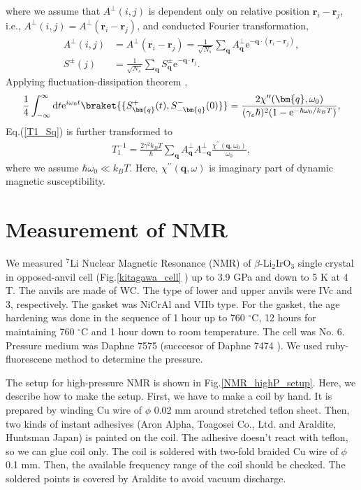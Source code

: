 where we assume that $A^\perp (i, j)$ is dependent only on relative position $\bm{r}_i - \bm{r}_j$, i.e., $A^\perp (i, j) = A^\perp(\bm{r}_i - \bm{r}_j)$,
and conducted Fourier transformation,
\begin{align}
A^\perp (i, j) &= A^\perp(\bm{r}_i - \bm{r}_j) = \frac{1}{\sqrt{N_s}}\sum_{\bm{q}}A^\perp_{\bm{q}}\mathrm{e}^{-\bm{q}\cdot(\bm{r}_i - \bm{r}_j)},\\
S^\pm (j) &= \frac{1}{\sqrt{N_s}}\sum_{\bm{q}} S^\pm_{\bm{q}}\mathrm{e}^{-\bm{q}\cdot\bm{r}_j}.
\end{align}
Applying fluctuation-dissipation theorem \cite{Kitaoka},
\begin{align}
\frac{1}{4}\int^{\infty}_{-\infty}\mathrm{d}t\mathrm{e}^{i\omega_0t} \braket{\{S^+_{\bm{q}}(t),S^-_{-\bm{q}}(0)\}}
= \frac{2\chi^{\prime\prime}(\bm{q}, \omega_0)}{(\gamma_e\hbar)^2(1-\mathrm{e}^{-\hbar\omega_0/k_BT})},
\end{align}
Eq.(\ref{T1_Sq}) is further transformed to
\begin{align}
\label{T1_chi}
T^{-1}_1 = \frac{2\gamma^2k_BT}{\hbar}\sum_{\bm{q}}A^{\perp}_{\bm{q}}A^\perp_{-\bm{q}} \frac{\chi^{\prime\prime}(\bm{q}, \omega_0)}{\omega_0},
\end{align}
where we assume $\hbar\omega_0 \ll k_BT$.
Here, $\chi^{\prime\prime}(\bm{q}, \omega)$ is imaginary part of dynamic magnetic susceptibility.


\section{Measurement of NMR}
We measured ${}^7$Li Nuclear Magnetic Resonance (NMR) of $\beta$-Li$_2$IrO$_3$ single crystal
in opposed-anvil cell (Fig.\ref{kitagawa_cell} \cite{Kitagawa2010}) up to 3.9 GPa and down to 5 K  at 4 T.
The anvils are made of WC.
The type of lower and upper anvils were IVc and 3, respectively.
The gasket was NiCrAl and VIIb type.
For the gasket, the age hardening was done in the sequence of 1 hour up to 760 ${}^\circ$C, 12 hours for maintaining 760 ${}^\circ$C and 1 hour down to room temperature.
The cell was No. 6.
Pressure medium was Daphne 7575 (succcesor of Daphne 7474 \cite{Murata2008}).
We used ruby-fluorescene method to determine the pressure.

The setup for high-pressure NMR is shown in Fig.\ref{NMR_highP_setup}.
Here, we describe how to make the setup.
First, we have to make a coil by hand.
It is prepared by winding Cu wire of $\phi$ 0.02 mm around stretched teflon sheet.
Then, two kinds of instant adhesives (Aron Alpha, Toagosei Co., Ltd. and Araldite, Huntsman Japan) is painted on the coil.
The adhesive doesn't react with teflon, so we can glue coil only.
The coil is soldered with two-fold braided Cu wire of $\phi$ 0.1 mm.
Then, the available frequency range of the coil should be checked.
The soldered points is covered by Araldite to avoid vacuum discharge.

